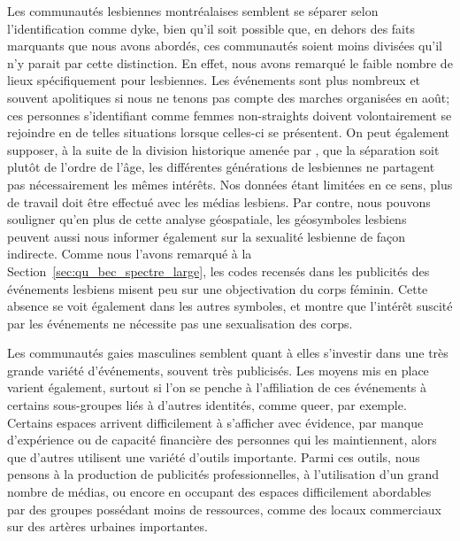 Les communautés lesbiennes montréalaises semblent se séparer selon l'identification comme dyke, bien qu'il soit possible que, en dehors des faits marquants que nous avons abordés, ces communautés soient moins divisées qu'il n'y parait par cette distinction.
En effet, nous avons remarqué le faible nombre de lieux spécifiquement pour lesbiennes.
Les événements sont plus nombreux et souvent apolitiques si nous ne tenons pas compte des marches organisées en août; ces personnes s'identifiant comme femmes non-straights doivent volontairement se rejoindre en de telles situations lorsque celles-ci se présentent.
On peut également supposer, à la suite de la division historique amenée par \citet{Giraud2014}, que la séparation soit plutôt de l'ordre de l'âge, les différentes générations de lesbiennes ne partagent pas nécessairement les mêmes intérêts.
Nos données étant limitées en ce sens, plus de travail doit être effectué avec les médias lesbiens.
Par contre, nous pouvons souligner qu'en plus de cette analyse géospatiale, les géosymboles lesbiens peuvent aussi nous informer également sur la sexualité lesbienne de façon indirecte.
Comme nous l'avons remarqué à la Section~\ref{sec:qu_bec_spectre_large}, les codes recensés dans les publicités des événements lesbiens misent peu sur une objectivation du corps féminin.
Cette absence se voit également dans les autres symboles, et montre que l'intérêt suscité par les événements ne nécessite pas une sexualisation des corps.

Les communautés gaies masculines semblent quant à elles s'investir dans une très grande variété d'événements, souvent très publicisés.
Les moyens mis en place varient également, surtout si l'on se penche à l'affiliation de ces événements à certains sous-groupes liés à d'autres identités, comme queer, par exemple.
Certains espaces arrivent difficilement à s'afficher avec évidence, par manque d'expérience ou de capacité financière des personnes qui les maintiennent, alors que d'autres utilisent une variété d'outils importante.
Parmi ces outils, nous pensons à la production de publicités professionnelles, à l'utilisation d'un grand nombre de médias, ou encore en occupant des espaces difficilement abordables par des groupes possédant moins de ressources, comme des locaux commerciaux sur des artères urbaines importantes.


